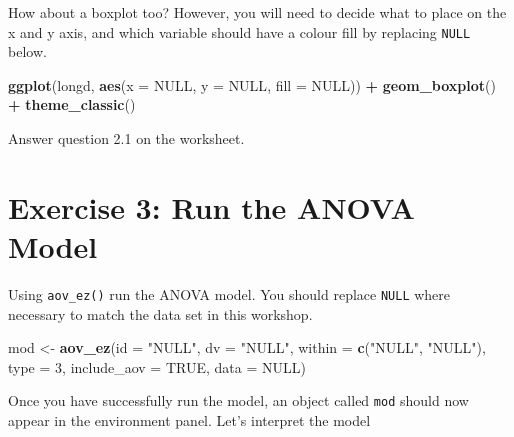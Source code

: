 \documentclass[
]{book}
\newenvironment{Shaded}{\begin{snugshade}}{\end{snugshade}}
\newcommand{\AttributeTok}[1]{\textcolor[rgb]{0.13,0.29,0.53}{#1}}
\newcommand{\ConstantTok}[1]{\textcolor[rgb]{0.56,0.35,0.01}{#1}}
\newcommand{\DecValTok}[1]{\textcolor[rgb]{0.00,0.00,0.81}{#1}}
\newcommand{\FunctionTok}[1]{\textcolor[rgb]{0.13,0.29,0.53}{\textbf{#1}}}
\newcommand{\NormalTok}[1]{#1}
\newcommand{\OtherTok}[1]{\textcolor[rgb]{0.56,0.35,0.01}{#1}}
\newcommand{\SpecialCharTok}[1]{\textcolor[rgb]{0.81,0.36,0.00}{\textbf{#1}}}
\newcommand{\StringTok}[1]{\textcolor[rgb]{0.31,0.60,0.02}{#1}}
\let\oldsection\section
\renewcommand{\section}{\needspace{5\baselineskip}\oldsection}
\begin{document}
How about a boxplot too? However, you will need to decide what to place on the x and y axis, and which variable should have a colour fill by replacing \texttt{NULL} below.

\begin{Shaded}
\begin{Highlighting}[]
\FunctionTok{ggplot}\NormalTok{(longd, }\FunctionTok{aes}\NormalTok{(}\AttributeTok{x =} \ConstantTok{NULL}\NormalTok{, }\AttributeTok{y =} \ConstantTok{NULL}\NormalTok{, }\AttributeTok{fill =} \ConstantTok{NULL}\NormalTok{)) }\SpecialCharTok{+}
  \FunctionTok{geom\_boxplot}\NormalTok{() }\SpecialCharTok{+}
  \FunctionTok{theme\_classic}\NormalTok{()}
\end{Highlighting}
\end{Shaded}

Answer question 2.1 on the worksheet.

\section{Exercise 3: Run the ANOVA Model}\label{exercise-3-run-the-anova-model-1}

Using \texttt{aov\_ez()} run the ANOVA model. You should replace \texttt{NULL} where necessary to match the data set in this workshop.

\begin{Shaded}
\begin{Highlighting}[]
\NormalTok{mod }\OtherTok{\textless{}{-}} \FunctionTok{aov\_ez}\NormalTok{(}\AttributeTok{id =} \StringTok{"NULL"}\NormalTok{,}
              \AttributeTok{dv =} \StringTok{"NULL"}\NormalTok{,}
              \AttributeTok{within =} \FunctionTok{c}\NormalTok{(}\StringTok{"NULL"}\NormalTok{, }\StringTok{"NULL"}\NormalTok{),}
              \AttributeTok{type =} \DecValTok{3}\NormalTok{,}
              \AttributeTok{include\_aov =} \ConstantTok{TRUE}\NormalTok{,}
              \AttributeTok{data =} \ConstantTok{NULL}\NormalTok{)}
\end{Highlighting}
\end{Shaded}

Once you have successfully run the model, an object called \texttt{mod} should now appear in the environment panel. Let's interpret the model

\begin{Shaded}
\end{Shaded}
\end{document}
